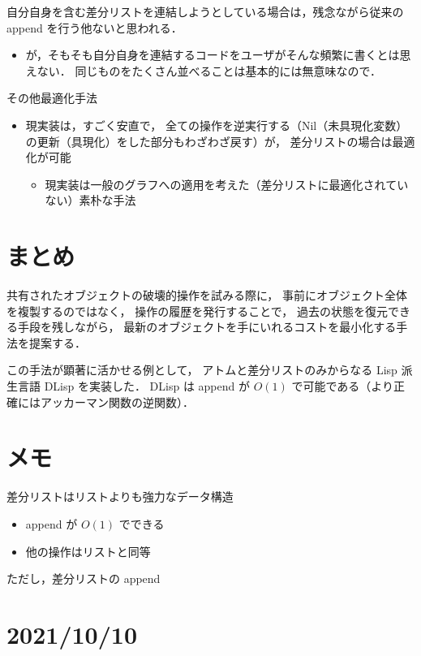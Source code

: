 \documentclass[10pt, a4j, twocolumn]{scrartcl}
\begin{document}
自分自身を含む差分リストを連結しようとしている場合は，残念ながら従来の append を行う他ないと思われる．
\begin{itemize}
\item が，そもそも自分自身を連結するコードをユーザがそんな頻繁に書くとは思えない．
同じものをたくさん並べることは基本的には無意味なので．
\end{itemize}


その他最適化手法
\begin{itemize}
\item 現実装は，すごく安直で，
全ての操作を逆実行する（Nil（未具現化変数）の更新（具現化）をした部分もわざわざ戻す）が，
差分リストの場合は最適化が可能
\begin{itemize}
\item 現実装は一般のグラフへの適用を考えた（差分リストに最適化されていない）素朴な手法
\end{itemize}
\end{itemize}


\section{まとめ}
\label{sec:org14ff329}

共有されたオブジェクトの破壊的操作を試みる際に，
事前にオブジェクト全体を複製するのではなく，
操作の履歴を発行することで，
過去の状態を復元できる手段を残しながら，
最新のオブジェクトを手にいれるコストを最小化する手法を提案する．

この手法が顕著に活かせる例として，
アトムと差分リストのみからなる Lisp 派生言語 DLisp を実装した．
DLisp は append が \(O(1)\) で可能である（より正確にはアッカーマン関数の逆関数）．




\section{メモ}
\label{sec:org6032087}

差分リストはリストよりも強力なデータ構造
\begin{itemize}
\item append が \(O(1)\) でできる
\item 他の操作はリストと同等
\end{itemize}


ただし，差分リストの append


\section{2021/10/10}
\label{sec:org0bbb043}
\end{document}

